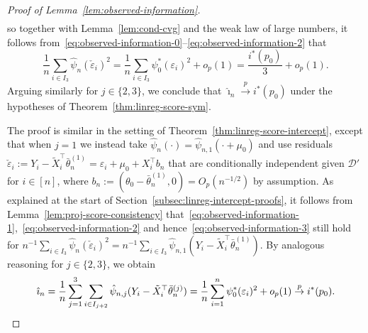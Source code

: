 \documentclass[a4paper]{article}
\newcommand{\cvp}{\overset{p}{\to}}
\theoremstyle{definition}
\begin{document}
\begin{proof}[Proof of Lemma~\ref{lem:observed-information}]
\begin{align}
\end{align}
so together with Lemma~\ref{lem:cond-cvg} and the weak law of large numbers, it follows from~\eqref{eq:observed-information-0}--\eqref{eq:observed-information-2} that
\begin{equation}
\label{eq:observed-information-3}
\frac{1}{n}\sum_{i \in I_3} \hat{\psi}_n(\check{\varepsilon}_i)^2 = \frac{1}{n}\sum_{i \in I_3} \psi_0^*(\varepsilon_i)^2 + o_p(1) = \frac{i^*(p_0)}{3} + o_p(1).
\end{equation}
Arguing similarly for $j \in \{2,3\}$, we conclude that $\hat{\imath}_n \cvp i^*(p_0)$ under the hypotheses of Theorem~\ref{thm:linreg-score-sym}.

The proof is similar in the setting of Theorem~\ref{thm:linreg-score-intercept}, except that when $j = 1$ we instead take $\hat{\psi}_n(\cdot) = \hat{\psi}_{n,1}(\cdot + \mu_0)$ and use residuals $\check{\varepsilon}_i := Y_i - \tilde{X}_i^\top\bar{\theta}_n^{(1)} = \varepsilon_i + \mu_0 + X_i^\top b_n$ that are conditionally independent given $\mathcal{D}'$ for $i \in [n]$, where $b_n := (\theta_0 - \bar{\theta}_n^{(1)}, 0) = O_p(n^{-1/2})$ by assumption. As explained at the start of Section~\ref{subsec:linreg-intercept-proofs}, it follows from Lemma~\ref{lem:proj-score-consistency} that~\eqref{eq:observed-information-1},~\eqref{eq:observed-information-2} and hence~\eqref{eq:observed-information-3} still hold for $n^{-1}\sum_{i \in I_3} \hat{\psi}_n(\check{\varepsilon}_i)^2 = n^{-1}\sum_{i \in I_3} \hat{\psi}_{n,1}(Y_i - \tilde{X}_i^\top\bar{\theta}_n^{(1)})$. By analogous reasoning for $j \in \{2,3\}$, we obtain
\[
\hat{\imath}_n = \frac{1}{n}\sum_{j=1}^3 \sum_{i \in I_{j+2}} \hat{\psi}_{n,j}(Y_i - \tilde{X}_i^\top\bar{\theta}_n^{(j)}) = \frac{1}{n}\sum_{i=1}^n \psi_0^*(\varepsilon_i)^2 + o_p(1) \cvp i^*(p_0). \qedhere
\]
\end{proof}
\end{document}
